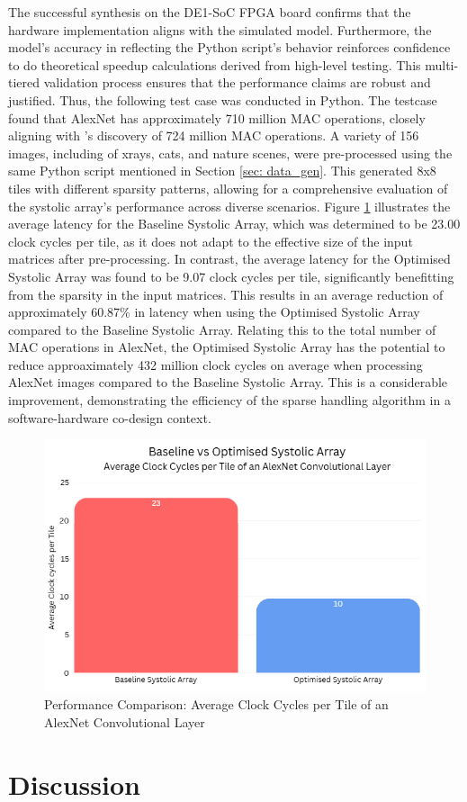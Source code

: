 \documentclass[12pt, a4paper, ukenglish]{article}
\newcommand{\performanceComparison}{
    \begin{figure}[ht]
        \centering
        \includegraphics[width=0.5\linewidth]{results/Performance Comparison - Average Clock Cycles per Tile of an AlexNet Convolutional Layer.png}
        \caption{Performance Comparison: Average Clock Cycles per Tile of an AlexNet Convolutional Layer}
        \label{fig:performance_comparison}
    \end{figure}
}
\begin{document}
    The successful synthesis on the DE1-SoC FPGA board confirms that the hardware implementation aligns with the simulated model. Furthermore, the model's accuracy in reflecting the Python script's behavior reinforces confidence to do theoretical speedup calculations derived from high-level testing. This multi-tiered validation process ensures that the performance claims are robust and justified. Thus, the following test case was conducted in Python.
    \newline
    The testcase found that AlexNet has approximately 710 million MAC operations, closely aligning with \textcite{tiwari_data_2022}'s discovery of 724 million MAC operations. A variety of 156 images, including of xrays, cats, and nature scenes, were pre-processed using the same Python script mentioned in Section \ref{sec: data_gen}. This generated 8x8 tiles with different sparsity patterns, allowing for a comprehensive evaluation of the systolic array's performance across diverse scenarios.
    \newline
    Figure \ref{fig:performance_comparison} illustrates the average latency for the Baseline Systolic Array, which was determined to be 23.00 clock cycles per tile, as it does not adapt to the effective size of the input matrices after pre-processing. In contrast, the average latency for the Optimised Systolic Array was found to be 9.07 clock cycles per tile, significantly benefitting from the sparsity in the input matrices. This results in an average reduction of approximately 60.87\% in latency when using the Optimised Systolic Array compared to the Baseline Systolic Array.
    \newline
    Relating this to the total number of MAC operations in AlexNet, the Optimised Systolic Array has the potential to reduce approaximately 432 million clock cycles on average when processing AlexNet images compared to the Baseline Systolic Array. This is a considerable improvement, demonstrating the efficiency of the sparse handling algorithm in a software-hardware co-design context. 
    
    

    
    \performanceComparison
    

\section{Discussion} \label{sec: discussion}
\end{document}
